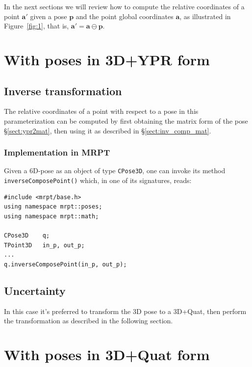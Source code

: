 \documentclass[a4paper,11pt]{report}
\begin{document}
In the next sections we will review how to compute the relative coordinates 
of a point $\mathbf{a'}$ given a pose $\mathbf{p}$ and the point global coordinates
$\mathbf{a}$,
as illustrated in Figure~\ref{fig:1}, that is, $\mathbf{a'} = \mathbf{a} \ominus \mathbf{p}$.

\section{With poses in 3D+YPR form}

\subsection{Inverse transformation}

The relative coordinates of a point with respect to a pose in this parameterization can be computed
by first obtaining the matrix form of the pose \S\ref{sect:ypr2mat}, then using it as described in \S\ref{sect:inv_comp_mat}.



\subsubsection{Implementation in MRPT}

Given a 6D-pose as an object of type \texttt{CPose3D}, one can invoke its method 
\texttt{inverseComposePoint()} which, in one of its signatures, reads:

\begin{lstlisting}
#include <mrpt/base.h> 
using namespace mrpt::poses; 
using namespace mrpt::math; 

CPose3D    q;
TPoint3D   in_p, out_p;
...
q.inverseComposePoint(in_p, out_p);
\end{lstlisting}


\subsection{Uncertainty}

In this case it's preferred to transform the 3D pose to a 3D+Quat, then
perform the transformation as described in the following section.



\section{With poses in 3D+Quat form}
\label{sect:point_inv:quat}
\end{document}

